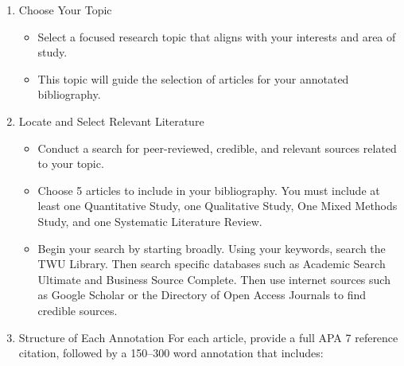 \documentclass[
  letterpaper,
  DIV=11,
  numbers=noendperiod]{scrreprt}
\providecommand{\tightlist}{%
  \setlength{\itemsep}{0pt}\setlength{\parskip}{0pt}}\usepackage{longtable,booktabs,array}
\begin{document}
\begin{enumerate}
\def\labelenumi{\arabic{enumi}.}
\tightlist
\item
  Choose Your Topic

  \begin{itemize}
  \tightlist
  \item
    Select a focused research topic that aligns with your interests and
    area of study.
  \item
    This topic will guide the selection of articles for your annotated
    bibliography.
  \end{itemize}
\item
  Locate and Select Relevant Literature

  \begin{itemize}
  \tightlist
  \item
    Conduct a search for peer-reviewed, credible, and relevant sources
    related to your topic.
  \item
    Choose 5 articles to include in your bibliography. You must include
    at least one Quantitative Study, one Qualitative Study, One Mixed
    Methods Study, and one Systematic Literature Review.
  \item
    Begin your search by starting broadly. Using your keywords, search
    the TWU Library. Then search specific databases such as Academic
    Search Ultimate and Business Source Complete. Then use internet
    sources such as Google Scholar or the Directory of Open Access
    Journals to find credible sources.
  \end{itemize}
\item
  Structure of Each Annotation For each article, provide a full APA 7
  reference citation, followed by a 150--300 word annotation that
  includes:


\end{enumerate}
\end{document}
